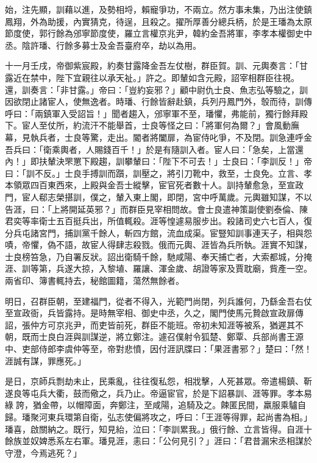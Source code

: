 \begin{pinyinscope}
 始，注先顯，訓藉以進，及勢相埒，賴寵爭功，不兩立。然方事未集，乃出注使鎮鳳翔，外為助援，內實猜克，待逞，且殺之。擢所厚善分總兵柄，於是王璠為太原節度使，郭行餘為邠寧節度使，羅立言權京兆尹，韓約金吾將軍，李孝本權御史中丞。陰許璠、行餘多募士及金吾臺府卒，劫以為用。



 十一月壬戌，帝御紫宸殿，約奏甘露降金吾左仗樹，群臣賀。訓、元輿奏言：「甘露近在禁中，陛下宜親往以承天祉。」許之。即輦如含元殿，詔宰相群臣往視。還，訓奏言：「非甘露。」帝曰：「豈約妄邪？」顧中尉仇士良、魚志弘等驗之，訓因欲閉止諸宦人，使無逸者。時璠、行餘皆辭赴鎮，兵列丹鳳門外，彀而待，訓傳呼曰：「兩鎮軍入受詔旨！」聞者趨入，邠寧軍不至，璠懼，弗能前，獨行餘拜殿下。宦人至仗所，約流汗不能舉首，士良等怪之曰：「將軍何為爾？」會風動廡幕，見執兵者，士良等驚，走出。閽者將闔扉，為宦侍叱爭，不及閉。訓急連呼金吾兵曰：「衛乘輿者，人賜錢百千！」於是有隨訓入者。宦人曰：「急矣，上當還內！」即扶輦決罘罳下殿趨，訓攀輦曰：「陛下不可去！」士良曰：「李訓反！」帝曰：「訓不反。」士良手搏訓而躓，訓壓之，將引刀靴中，救至，士良免。立言、孝本領眾四百東西來，上殿與金吾士縱擊，宦官死者數十人。訓持輦愈急，至宣政門，宦人郗志榮揕訓，僕之，輦入東上閣，即閉，宮中呼萬歲。元輿雖知謀，不以告涯，曰：「上將開延英邪？」而群臣見宰相問故。會士良遣神策副使劉泰倫、陳君奕等率衛士五百挺兵出，所值輒殺。涯等惶遽易服步出。殺諸司史六七百人，復分兵屯諸宮門，捕訓黨千餘人，斬四方館，流血成渠。宦豎知訓事連天子，相與怨嘖，帝懼，偽不語，故宦人得肆志殺戮。俄而元輿、涯皆為兵所執。涯實不知謀，士良榜笞急，乃自署反狀。詔出衛騎千餘，馳咸陽、奉天捕亡者，大索都城，分掩涯、訓等第，兵遂大掠，入黎埴、羅讓、渾金歲、胡證等家及賈耽廟，貲產一空。兩省印、簿書輒持去，秘館圖籍，蕩然無餘者。



 明日，召群臣朝，至建福門，從者不得入，光範門尚閉，列兵誰何，乃繇金吾右仗至宣政衙，兵皆露持。是時無宰相、御史中丞，久之，閣門使馬元贄啟宣政扉傳詔，張仲方可京兆尹，而吏皆前死，群臣不能班。帝初未知涯等被系，猶遲其不朝，既而士良白涯與訓謀逆，將立鄭注。遽召僕射令狐楚、鄭覃、兵部尚書王源中、吏部侍郎李虞仲等至，帝對悲憤，因付涯訊牒曰：「果涯書邪？」楚曰：「然！涯誠有謀，罪應死。」



 是日，京師兵剽劫未止，民乘亂，往往復私怨，相戕擊，人死甚眾。帝遣楊鎮、靳遂良等屯兵大衢，鼓而儆之，兵乃止。帝逼宦官，於是下詔暴訓、涯等罪。孝本易綠誇，猶金帶，以帽障面，奔鄭注，至咸陽，追騎及之。餗匿民間，羸服乘驢自歸。璠聚河東兵環第自衛，弘志使偏將攻之，呼曰：「王涯等得罪，起尚書為相。」璠喜，啟關納之。既行，知見紿，泣曰：「李訓累我。」俄行餘、立言皆得。自涯十餘族並奴婢悉系左右軍。璠見涯，恚曰：「公何見引？」涯曰：「君昔漏宋丞相謀於守澄，今焉逃死？」




\end{pinyinscope}
